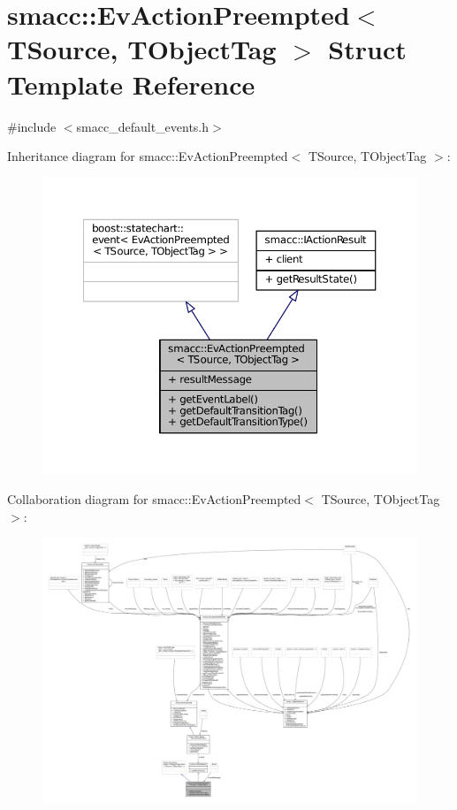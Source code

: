 \hypertarget{structsmacc_1_1EvActionPreempted}{}\section{smacc\+:\+:Ev\+Action\+Preempted$<$ T\+Source, T\+Object\+Tag $>$ Struct Template Reference}
\label{structsmacc_1_1EvActionPreempted}


{\ttfamily \#include $<$smacc\+\_\+default\+\_\+events.\+h$>$}



Inheritance diagram for smacc\+:\+:Ev\+Action\+Preempted$<$ T\+Source, T\+Object\+Tag $>$\+:
\nopagebreak
\begin{figure}[H]
\begin{center}
\leavevmode
\includegraphics[width=350pt]{structsmacc_1_1EvActionPreempted__inherit__graph}
\end{center}
\end{figure}


Collaboration diagram for smacc\+:\+:Ev\+Action\+Preempted$<$ T\+Source, T\+Object\+Tag $>$\+:
\nopagebreak
\begin{figure}[H]
\begin{center}
\leavevmode
\includegraphics[width=350pt]{structsmacc_1_1EvActionPreempted__coll__graph}
\end{center}
\end{figure}
